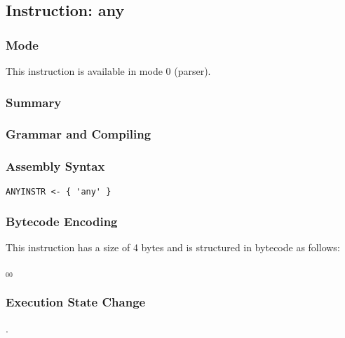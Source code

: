 \subsection{Instruction: any}

\subsubsection{Mode}
This instruction is available in mode 0 (parser).
\subsubsection{Summary}


\subsubsection{Grammar and Compiling}


\subsubsection{Assembly Syntax}

\begin{myquote}
\begin{verbatim}
ANYINSTR <- { 'any' }
\end{verbatim}
\end{myquote}

\subsubsection{Bytecode Encoding}

This instruction has a size of 4 bytes and is structured in bytecode as follows:

$_{00}$\ 


\subsubsection{Execution State Change}

.



